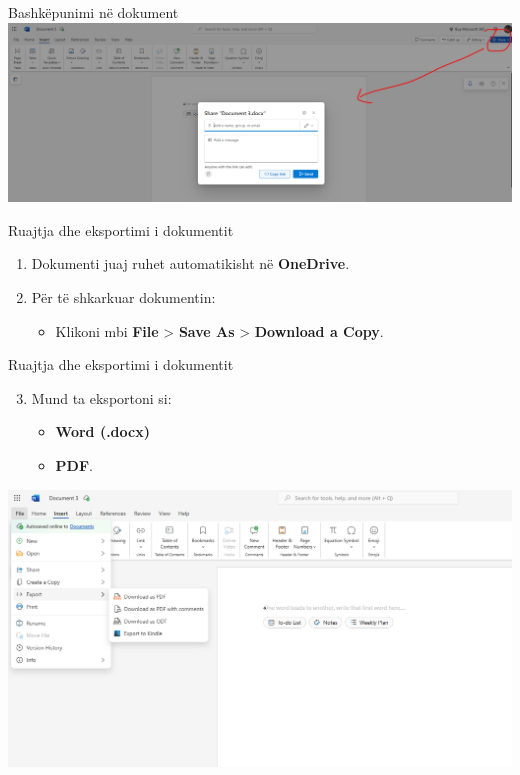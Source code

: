 \documentclass[
  ignorenonframetext,
]{beamer}
\providecommand{\tightlist}{%
  \setlength{\itemsep}{0pt}\setlength{\parskip}{0pt}}
\begin{document}
\begin{frame}{Bashkëpunimi në dokument}
\label{bashkuxebpunimi-nuxeb-dokument-1}
\includegraphics{./images/word6.png}
\end{frame}

\begin{frame}{Ruajtja dhe eksportimi i dokumentit}
\label{ruajtja-dhe-eksportimi-i-dokumentit}
\begin{enumerate}
\item
  Dokumenti juaj ruhet automatikisht në \textbf{OneDrive}.
\item
  Për të shkarkuar dokumentin:

  \begin{itemize}
  \tightlist
  \item
    Klikoni mbi \textbf{File} \textgreater{} \textbf{Save As}
    \textgreater{} \textbf{Download a Copy}.
  \end{itemize}
\end{enumerate}
\end{frame}

\begin{frame}{Ruajtja dhe eksportimi i dokumentit}
\label{ruajtja-dhe-eksportimi-i-dokumentit-1}
\begin{enumerate}
\setcounter{enumi}{2}
\item
  Mund ta eksportoni si:

  \begin{itemize}
  \item
    \textbf{Word (.docx)}
  \item
    \textbf{PDF}.
  \end{itemize}
\end{enumerate}

\includegraphics{./images/word7.png}
\end{frame}
\end{document}
